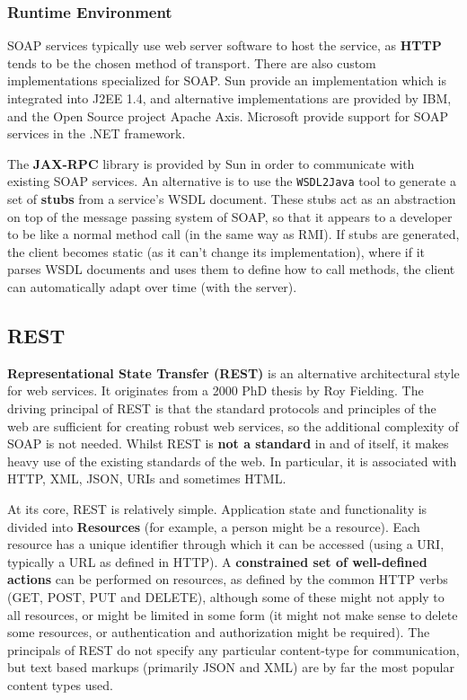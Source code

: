 \documentclass{article}
\begin{document}
\subsubsection{Runtime Environment}

SOAP services typically use web server software to host the service, as \textbf{HTTP} tends to be the chosen method of transport. There are also custom implementations specialized for SOAP. Sun provide an implementation which is integrated into J2EE 1.4, and alternative implementations are provided by IBM, and the Open Source project Apache Axis. Microsoft provide support for SOAP services in the .NET framework. 

The \textbf{JAX-RPC} library is provided by Sun in order to communicate with existing SOAP services. An alternative is to use the \texttt{WSDL2Java} tool to generate a set of \textbf{stubs} from a service's WSDL document. These stubs act as an abstraction on top of the message passing system of SOAP, so that it appears to a developer to be like a normal method call (in the same way as RMI). If stubs are generated, the client becomes static (as it can't change its implementation), where if it parses WSDL documents and uses them to define how to call methods, the client can automatically adapt over time (with the server).


\subsection{REST}

\textbf{Representational State Transfer (REST)} is an alternative architectural style for web services. It originates from a 2000 PhD thesis by Roy Fielding. The driving principal of REST is that the standard protocols and principles of the web are sufficient for creating robust web services, so the additional complexity of SOAP is not needed. Whilst REST is \textbf{not a standard} in and of itself, it makes heavy use of the existing standards of the web. In particular, it is associated with HTTP, XML, JSON, URIs and sometimes HTML. 

At its core, REST is relatively simple. Application state and functionality is divided into \textbf{Resources} (for example, a person might be a resource). Each resource has a unique identifier through which it can be accessed (using a URI, typically a URL as defined in HTTP). A \textbf{constrained set of well-defined actions} can be performed on resources, as defined by the common HTTP verbs (GET, POST, PUT and DELETE), although some of these might not apply to all resources, or might be limited in some form (it might not make sense to delete some resources, or authentication and authorization might be required). The principals of REST do not specify any particular content-type for communication, but text based markups (primarily JSON and XML) are by far the most popular content types used.
\end{document}
